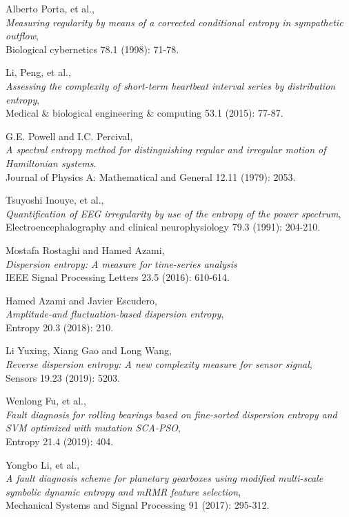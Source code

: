 \documentclass[12pt, a4paper, titlepage, openany]{book}
\begin{document}
\begin{thebibliography}{9}
Alberto Porta, et al.,\\
\emph{Measuring regularity by means of a corrected conditional entropy in sympathetic outflow},\\
Biological cybernetics 78.1 (1998): 71-78.

Li, Peng, et al.,\\
\emph{Assessing the complexity of short-term heartbeat interval series by distribution entropy},\\
Medical \& biological engineering \& computing 53.1 (2015): 77-87. 

 G.E. Powell and I.C. Percival,\\
\emph{A spectral entropy method for distinguishing regular and irregular motion of Hamiltonian systems}.\\
Journal of Physics A: Mathematical and General 12.11 (1979): 2053.
 
Tsuyoshi Inouye, et al.,\\
\emph{Quantification of EEG irregularity by use of the entropy of the power spectrum},\\
Electroencephalography and clinical neurophysiology 79.3 (1991): 204-210.

Mostafa Rostaghi and Hamed Azami,\\
\emph{Dispersion entropy: A measure for time-series analysis}\\
IEEE Signal Processing Letters 23.5 (2016): 610-614.
 
Hamed Azami and Javier Escudero,\\
\emph{Amplitude-and fluctuation-based dispersion entropy},\\
Entropy 20.3 (2018): 210.
 
Li Yuxing, Xiang Gao and Long Wang,\\
\emph{Reverse dispersion entropy: A new complexity measure for sensor signal},\\
Sensors 19.23 (2019): 5203.
 
Wenlong Fu, et al.,\\
\emph{Fault diagnosis for rolling bearings based on fine-sorted dispersion entropy and SVM optimized with mutation SCA-PSO},\\
Entropy 21.4 (2019): 404.

Yongbo Li, et al.,\\
\emph{A fault diagnosis scheme for planetary gearboxes using modified multi-scale symbolic dynamic entropy and mRMR feature selection},\\
Mechanical Systems and Signal Processing 91 (2017): 295-312. 
 

\end{thebibliography}
\end{document}
